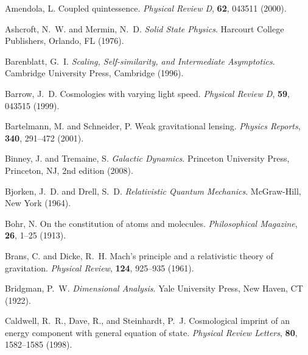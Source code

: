 \documentclass[12pt,a4paper]{article}
\begin{document}
\begin{thebibliography}{99}
		Amendola, L.
		\newblock Coupled quintessence.
		\newblock \textit{Physical Review D}, \textbf{62}, 043511 (2000).
		\newblock {}
		
		Ashcroft, N.~W. and Mermin, N.~D.
		\newblock \textit{Solid State Physics}.
		\newblock Harcourt College Publishers, Orlando, FL (1976).
		
		Barenblatt, G.~I.
		\newblock \textit{Scaling, Self-similarity, and Intermediate Asymptotics}.
		\newblock Cambridge University Press, Cambridge (1996).
		
		Barrow, J.~D.
		\newblock Cosmologies with varying light speed.
		\newblock \textit{Physical Review D}, \textbf{59}, 043515 (1999).
		\newblock {}
		
		Bartelmann, M. and Schneider, P.
		\newblock Weak gravitational lensing.
		\newblock \textit{Physics Reports}, \textbf{340}, 291--472 (2001).
		\newblock {}
		
		Binney, J. and Tremaine, S.
		\newblock \textit{Galactic Dynamics}.
		\newblock Princeton University Press, Princeton, NJ, 2nd edition (2008).
		
		Bjorken, J.~D. and Drell, S.~D.
		\newblock \textit{Relativistic Quantum Mechanics}.
		\newblock McGraw-Hill, New York (1964).
		
		Bohr, N.
		\newblock On the constitution of atoms and molecules.
		\newblock \textit{Philosophical Magazine}, \textbf{26}, 1--25 (1913).
		\newblock {}
		
		Brans, C. and Dicke, R.~H.
		\newblock Mach's principle and a relativistic theory of gravitation.
		\newblock \textit{Physical Review}, \textbf{124}, 925--935 (1961).
		\newblock {}
		
		Bridgman, P.~W.
		\newblock \textit{Dimensional Analysis}.
		\newblock Yale University Press, New Haven, CT (1922).
		
		Caldwell, R.~R., Dave, R., and Steinhardt, P.~J.
		\newblock Cosmological imprint of an energy component with general equation of state.
		\newblock \textit{Physical Review Letters}, \textbf{80}, 1582--1585 (1998).
		\newblock {}
		

\end{thebibliography}
\end{document}
